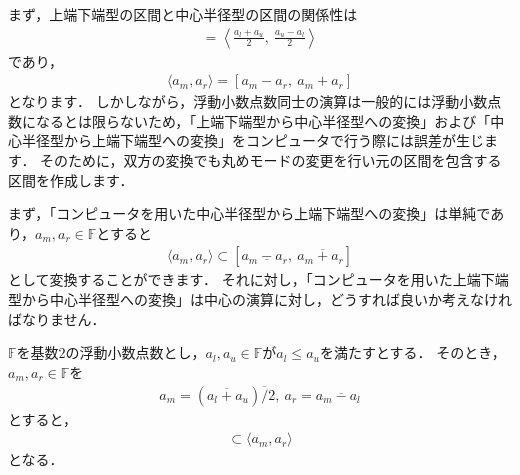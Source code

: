 まず，上端下端型の区間と中心半径型の区間の関係性は
\begin{align*}
	[ a_l, a_u ] = \left\langle \frac{ a_l + a_u }{2}, ~ \frac{ a_u - a_l }{2}  \right\rangle
\end{align*}
であり，
\begin{align*}
	\langle a_m, a_r  \rangle = [ a_m - a_r, ~ a_m + a_r ]
\end{align*}
となります．
しかしながら，浮動小数点数同士の演算は一般的には浮動小数点数になるとは限らないため，「上端下端型から中心半径型への変換」および「中心半径型から上端下端型への変換」をコンピュータで行う際には誤差が生じます．
そのために，双方の変換でも丸めモードの変更を行い元の区間を包含する区間を作成します．

まず，「コンピュータを用いた中心半径型から上端下端型への変換」は単純であり，$a_m, a_r \in {\mathbb F}$とすると
\begin{align*}
	\langle a_m, a_r  \rangle \subset [ a_m ~ \underline{-} ~ a_r, ~ a_m ~  \overline{+} ~ a_r ]
\end{align*}
として変換することができます．
それに対し，「コンピュータを用いた上端下端型から中心半径型への変換」は中心の演算に対し，どうすれば良いか考えなければなりません．


\begin{Thm}[上端下端型から中心半径型への変換]\label{thm:infsup_to_midrad}
	${\mathbb F}$を基数$2$の浮動小数点数とし，$a_l, a_u \in {\mathbb F}$が$a_l \le a_u$を満たすとする．	  
	そのとき，$a_m, a_r \in {\mathbb F}$を
	\begin{align*}
		a_m = (a_l ~ \overline{+} ~ a_u) \overline{/} 2 , ~ a_r = a_m ~ \overline{-} ~ a_l
	\end{align*}
	とすると，
	\begin{align*}
		[ a_l, a_u ] \subset \langle a_m, a_r \rangle
	\end{align*}
	となる．
\end{Thm}

